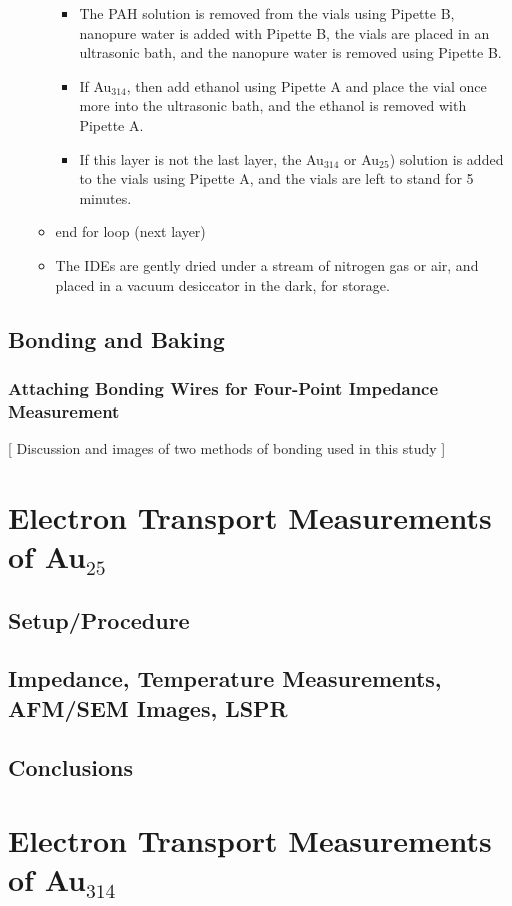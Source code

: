 \documentclass[12pt,oneside,english]{article}
\begin{document}
\begin{itemize}
\begin{itemize}
\begin{itemize}
				\item The PAH solution is removed from the vials using Pipette B,  nanopure water is added with Pipette B, the vials are placed in an ultrasonic bath, and the nanopure water is removed using Pipette B.
				\item If Au$_{314}$, then add ethanol using Pipette A and place the vial once more into the ultrasonic bath, and the ethanol is removed with Pipette A.
				\item If this layer is not the last layer, the Au$_{314}$ or Au$_{25}$) solution is added to the vials using Pipette A, and the vials are left to stand for 5 minutes.
			\end{itemize}
			\item end for loop (next layer)
			\item The IDEs are gently dried under a stream of nitrogen gas or air, and placed in a vacuum desiccator in the dark, for storage.
		\end{itemize}
	\end{itemize}

	\subsection{Bonding and Baking}
	
	\subsubsection{Attaching Bonding Wires for Four-Point Impedance Measurement}
	[ Discussion and images of two methods of bonding used in this study ]
	
	
	\section{Electron Transport Measurements of Au$_{25}$}
	\subsection{Setup/Procedure}
	\subsection{Impedance, Temperature Measurements, AFM/SEM Images, LSPR}
	\subsection{Conclusions}

	\section{Electron Transport Measurements of Au$_{314}$}
\end{document}
